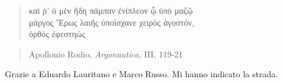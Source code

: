 \begin{verse}
	\begin{otherlanguage}{greek}
		καί ῥ' ὁ μὲν ἤδη πάμπαν ἐνίπλεον ᾧ ὑπὸ μαζῷ\\
		μάργος Ἔρως λαιῆς ὑποΐσχανε χειρὸς ἀγοστόν,\\
		ὀρθὸς ἐφεστηώς
	\end{otherlanguage}
\end{verse}

\begin{verse}
Apollonio Rodio, \emph{Argonautica}, III, 119-21
\end{verse}

\newpage

\vspace*{12cm}

Grazie a Eduardo Lauritano e Marco Russo. Mi hanno indicato la strada.
